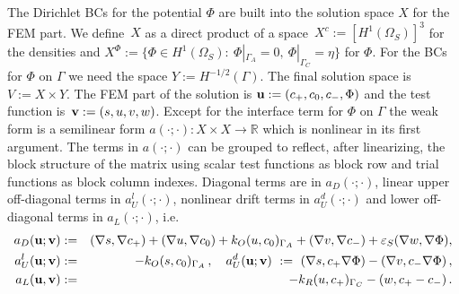 \documentclass[runningheads]{lncse}
\begin{document}
%
The Dirichlet BCs for the potential $\Phi$ 
are built into the solution space $X$
for the FEM part.
%
We define~$X$ as a direct product of a space~$X^c := [H^1(\Omega_S)]^3  $ for the densities and 
$X^{\Phi} :=  \{   \Phi \in H^1(\Omega_S) : ~ \Phi|_{\Gamma_A} = 0, ~\Phi|_{\Gamma_C} = \eta   \} $ for $\Phi$.
% 
For the BCs for $\Phi$ on $\Gamma$ we need
the space $Y := H^{-1/2}(\Gamma)$.
The final solution space is $V := X \times Y$.
%
%
The FEM part of the solution is
${\bf u} :=  (c_{+}, c_{0}, c_{-}, \Phi)
$
and the test function is~${\bf v} := (s,u,v,w)$. 
%
%
Except for the interface term for $\Phi$ on $\Gamma$ the weak form 
is
a semilinear form 
$
a(\cdot; \cdot) : X \times X \to \mathbb{R}
$
 which is nonlinear in its first argument.
%
The terms in $a(\cdot; \cdot) $ can be grouped to reflect, after linearizing, the block structure of the matrix 
using 
scalar test functions as block row and 
trial functions as block column indexes.
%
Diagonal terms are 
in $a_D(\cdot; \cdot) $, linear upper off-diagonal terms in $a^{l}_U(\cdot; \cdot) $, nonlinear drift terms in $a^{d}_U(\cdot; \cdot) $ and lower off-diagonal terms in $a_L(\cdot; \cdot) $, i.e.
\begin{eqnarray*}
a_D({\bf u}; {\bf v}) & := & (\nabla s, \nabla c_+)  + 
(\nabla u, \nabla c_0)  %
 + k_O ( u,   c_0 )_{\Gamma_A} 
 +
 (\nabla v, \nabla c_-) 
 +
  \varepsilon_S (\nabla w, \nabla \Phi), \\
a^{l}_U({\bf u}; {\bf v}) & := & - k_O ( s, c_0 )_{\Gamma_A}  \,, \quad
a^{d}_U({\bf u}; {\bf v}) ~ := ~  (\nabla s, c_+ \nabla \Phi) - (\nabla v, c_- \nabla \Phi)  \,,
\\
a_L({\bf u}, {\bf v}) & := &  - k_R  ( u, c_+ )_{\Gamma_C}   - ( w, c_+ - c_- ) \,.
\end{eqnarray*}
\end{document}
